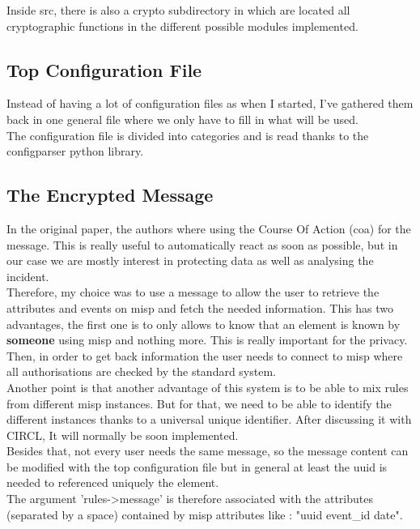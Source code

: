\documentclass{eplmastersthesis}
\begin{document}
Inside src, there is also a crypto subdirectory in which are located all cryptographic functions in the different possible modules implemented.

\subsection{Top Configuration File}
Instead of having a lot of configuration files as when I started, I've gathered them back in one general file where we only have to fill in what will be used.\\
The configuration file is divided into categories and is read thanks to the configparser python library.

\subsection{The Encrypted Message}
In the original paper, the authors where using the Course Of Action (\gls{coa}) for the message. This is really useful to automatically react as soon as possible, but in our case we are mostly interest in protecting data as well as analysing the incident.\\
Therefore, my choice was to use a message to allow the user to retrieve the attributes and events on \gls{misp} and fetch the needed information. This has two advantages, the first one is to only allows to know that an element is known by \textbf{someone} using \gls{misp} and nothing more. This is really important for the privacy. Then, in order to get back information the user needs to connect to \gls{misp} where all authorisations are checked by the standard system.\\

Another point is that another advantage of this system is to be able to mix rules from different \gls{misp} instances. But for that, we need to be able to identify the different instances thanks to a universal unique identifier. After discussing it with CIRCL, It will normally be soon implemented.\\

Besides that, not every user needs the same message, so the message content can be modified with the top configuration file but in general at least the \gls{uuid} is needed to referenced uniquely the element.\\
The argument 'rules->message' is therefore associated with the attributes (separated by a space) contained by \gls{misp} attributes like : "uuid event\_id date".
\end{document}
